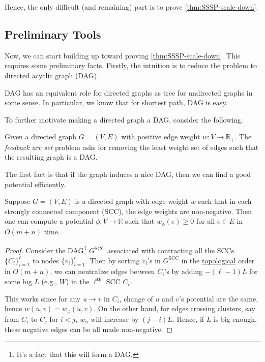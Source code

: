 Hence, the only difficult (and remaining) part is to prove \autoref{thm:SSSP-scale-down}.

\subsection{Preliminary Tools}
Now, we can start building up toward proving \autoref{thm:SSSP-scale-down}. This requires some preliminary facts. Firstly, the intuition is to reduce the problem to directed acyclic graph (DAG).

\begin{intuition}
	DAG has an equivalent role for directed graphs as tree for undirected graphs in some sense. In particular, we know that for shortest path, DAG is easy.
\end{intuition}

To further motivate making a directed graph a DAG, consider the following.

\begin{problem}\label{prb:feedback-arc-set}
Given a directed graph \(G = (V, E)\) with positive edge weight \(w \colon V \to \mathbb{R} _ +\). The \emph{feedback arc set} problem asks for removing the least weight set of edges such that the resulting graph is a DAG.
\end{problem}

The first fact is that if the graph induces a nice DAG, then we can find a good potential efficiently.

\begin{lemma}\label{lma:SSSP-fix-DAG}
	Suppose \(G = (V, E)\) is a directed graph with edge weight \(w\) such that in each strongly connected component (SCC), the edge weights are non-negative. Then one can compute a potential \(\phi \colon V \to \mathbb{R} \) such that \(w_{\phi } (e) \geq 0\) for all \(e \in E\) in \(O(m + n)\) time.
\end{lemma}
\begin{proof}
	Consider the DAG\footnote{It's a fact that this will form a DAG.} \(G^{\text{SCC} }\) associated with contracting all the SCCs \(\{ C_i \} _{i=1}^{\ell }\) to nodes \(\{ v_i \} _{i=1}^{\ell }\). Then by sorting \(v_i\)'s in \(G^{\text{SCC} }\) in the \href{https://en.wikipedia.org/wiki/Topological_sorting}{topological} order in \(O(m + n)\), we can neutralize edges between \(C_i\)'s by adding \(- (\ell - 1) L\) for some big \(L\) (e.g., \(W\)) in the \(\ell ^{\text{th} }\) SCC \(C_{\ell } \).
	\begin{center}
	\end{center}
	This works since for any \(u \to v\) in \(C_i\), change of \(u\) and \(v\)'s potential are the same, hence \(w (u, v)= w_{\phi }(u, v) \). On the other hand, for edges crossing clusters, say from \(C_i\) to \(C_j\) for \(i < j\), \(w_{\phi } \) will increase by \((j-i) L\). Hence, if \(L\) is big enough, these negative edges can be all made non-negative.
\end{proof}

